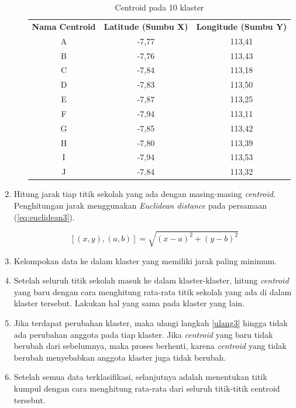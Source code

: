 \begin{enumerate}
\begin{enumerate}
\begin{table}[H]
\centering
\footnotesize
\begin{tabular}{ccc}
\rowcolor[HTML]{4472C4} 
{\color[HTML]{FFFFFF} \textbf{Nama   Centroid}} & {\color[HTML]{FFFFFF} \textbf{Latitude (Sumbu X)}} & {\color[HTML]{FFFFFF} \textbf{Longitude (Sumbu Y)}} \\
\rowcolor[HTML]{D9E1F2} 
A & -7,77 & 113,41 \\
B & -7,76 & 113,43 \\
\rowcolor[HTML]{D9E1F2} 
C & -7,84 & 113,18 \\
D & -7,83 & 113,50 \\
\rowcolor[HTML]{D9E1F2} 
E & -7,87 & 113,25 \\
F & -7,94 & 113,11 \\
\rowcolor[HTML]{D9E1F2} 
G & -7,85 & 113,42 \\
H & -7,80 & 113,39 \\
\rowcolor[HTML]{D9E1F2} 
I & -7,94 & 113,53 \\
J & -7,84 & 113,32
\end{tabular}
\caption{Centroid pada 10 klaster}
\label{tab:center10}
\end{table}

		
	\end{enumerate}

	\item \label{ulang3} Hitung jarak tiap titik sekolah yang ada dengan masing-masing \textit{centroid}. Penghitungan jarak menggunakan \textit{Euclidean distance} pada persamaan (\ref{eq:euclidean3}).
	
	\begin{equation}
	\left[ \left( x,y \right) ,\left( a,b \right)\right]=\sqrt{\left( x-a \right)^{2}+\left( y-b \right)^{2}}
	\label{eq:euclidean3}
	\end{equation}	
	
	\item Kelompokan data ke dalam klaster yang memiliki jarak paling minimum.
	\item Setelah seluruh titik sekolah masuk ke dalam klaster-klaster, hitung \textit{centroid} yang baru dengan cara menghitung rata-rata titik sekolah yang ada di dalam klaster tersebut. Lakukan hal yang sama pada klaster yang lain.
	\item Jika terdapat perubahan klaster, maka ulangi langkah \ref{ulang3} hingga tidak ada perubahan anggota pada tiap klaster. Jika \textit{centroid} yang baru tidak berubah dari sebelumnya, maka proses berhenti, karena \textit{centroid} yang tidak berubah menyebabkan anggota klaster juga tidak berubah.
	
	\item Setelah semua data terklasifikasi, selanjutnya adalah menentukan titik kumpul dengan cara menghitung rata-rata dari seluruh titik-titik centroid tersebut.
\end{enumerate}

